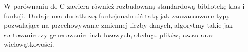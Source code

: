 W porównaniu do C zawiera również rozbudowaną standardową bibliotekę klas i funkcji.
Dodaje ona dodatkową funkcjonalność taką jak zaawansowane typy pozwalające na
przechowywanie zmiennej liczby danych, algorytmy takie jak sortowanie czy 
generowanie liczb losowych, obsługa plików, czasu oraz wielowątkowości.


